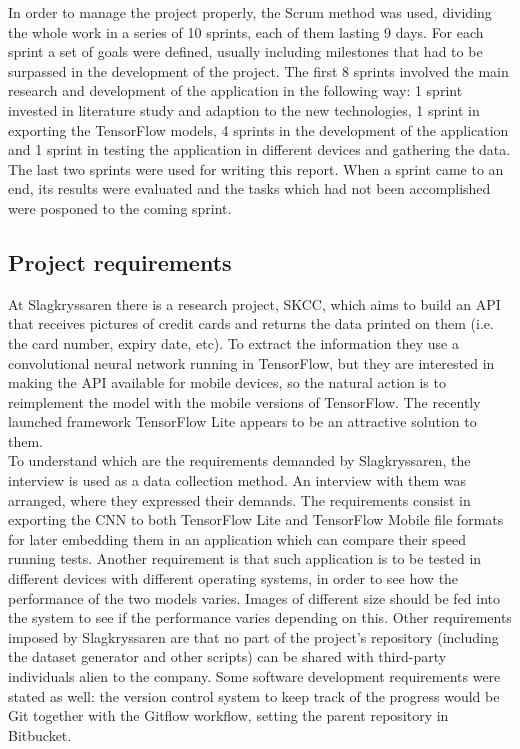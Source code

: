 In order to manage the project properly, the Scrum method was used, dividing the whole work in a series of 10 sprints, each of them lasting 9 days. For each sprint a set of goals were defined, usually including milestones that had to be surpassed in the development of the project. The first 8 sprints involved the main research and development of the application in the following way: 1 sprint invested in literature study and adaption to the new technologies, 1 sprint in exporting the TensorFlow models, 4 sprints in the development of the application and 1 sprint in testing the application in different devices and gathering the data. The last two sprints were used for writing this report. When a sprint came to an end, its results were evaluated and the tasks which had not been accomplished were posponed to the coming sprint.

\subsection{Project requirements}
At Slagkryssaren there is a research project, SKCC, which aims to build an API that receives pictures of credit cards and returns the data printed on them (i.e. the card number, expiry date, etc). To extract the information they use a convolutional neural network running in TensorFlow, but they are interested in making the API available for mobile devices, so the natural action is to reimplement the model with the mobile versions of TensorFlow. The recently launched framework TensorFlow Lite appears to be an attractive solution to them. \\

To understand which are the requirements demanded by Slagkryssaren, the interview is used as a data collection method. An interview with them was arranged, where they expressed their demands. The requirements consist in exporting the CNN to both TensorFlow Lite and TensorFlow Mobile file formats for later embedding them in an application which can compare their speed running tests. Another requirement is that such application is to be tested in different devices with different operating systems, in order to see how the performance of the two models varies. Images of different size should be fed into the system to see if the performance varies depending on this. Other requirements imposed by Slagkryssaren are that no part of the project's repository (including the dataset generator and other scripts) can be shared with third-party individuals alien to the company. Some software development requirements were stated as well: the version control system to keep track of the progress would be Git together with the Gitflow workflow, setting the parent repository in Bitbucket. \\  



